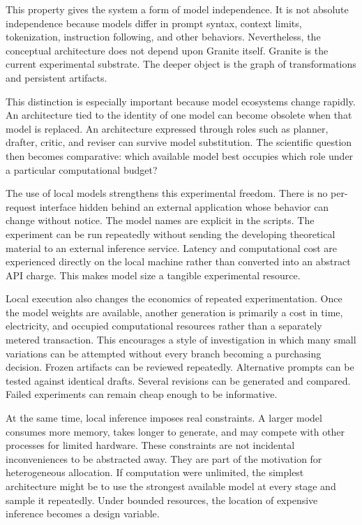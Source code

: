 \documentclass[11pt]{article}
\begin{document}
This property gives the system a form of model independence. It is not absolute independence because models differ in prompt syntax, context limits, tokenization, instruction following, and other behaviors. Nevertheless, the conceptual architecture does not depend upon Granite itself. Granite is the current experimental substrate. The deeper object is the graph of transformations and persistent artifacts.

This distinction is especially important because model ecosystems change rapidly. An architecture tied to the identity of one model can become obsolete when that model is replaced. An architecture expressed through roles such as planner, drafter, critic, and reviser can survive model substitution. The scientific question then becomes comparative: which available model best occupies which role under a particular computational budget?

The use of local models strengthens this experimental freedom. There is no per-request interface hidden behind an external application whose behavior can change without notice. The model names are explicit in the scripts. The experiment can be run repeatedly without sending the developing theoretical material to an external inference service. Latency and computational cost are experienced directly on the local machine rather than converted into an abstract API charge. This makes model size a tangible experimental resource.

Local execution also changes the economics of repeated experimentation. Once the model weights are available, another generation is primarily a cost in time, electricity, and occupied computational resources rather than a separately metered transaction. This encourages a style of investigation in which many small variations can be attempted without every branch becoming a purchasing decision. Frozen artifacts can be reviewed repeatedly. Alternative prompts can be tested against identical drafts. Several revisions can be generated and compared. Failed experiments can remain cheap enough to be informative.

At the same time, local inference imposes real constraints. A larger model consumes more memory, takes longer to generate, and may compete with other processes for limited hardware. These constraints are not incidental inconveniences to be abstracted away. They are part of the motivation for heterogeneous allocation. If computation were unlimited, the simplest architecture might be to use the strongest available model at every stage and sample it repeatedly. Under bounded resources, the location of expensive inference becomes a design variable.
\end{document}
